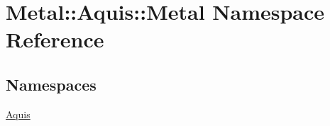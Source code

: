 \hypertarget{namespaceMetal_1_1Aquis_1_1Metal}{}\section{Metal\+:\+:Aquis\+:\+:Metal Namespace Reference}
\label{namespaceMetal_1_1Aquis_1_1Metal}
\subsection*{Namespaces}
\begin{DoxyCompactItemize}
\item 
 \hyperlink{namespaceMetal_1_1Aquis_1_1Metal_1_1Aquis}{Aquis}
\end{DoxyCompactItemize}
